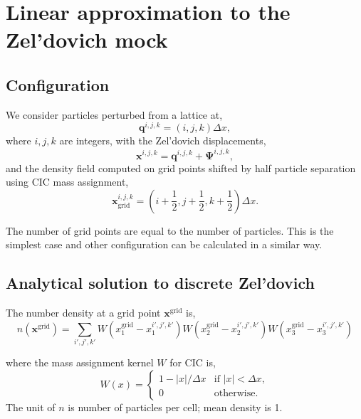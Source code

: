 \documentclass[a4paper,11pt]{article}
\begin{document}
\section{Linear approximation to the Zel'dovich mock}

\subsection{Configuration}

We consider particles perturbed from a lattice at,
\begin{equation}
  \bm{q}^{i,j,k} = (i, j, k) \Delta x,
\end{equation}
where $i, j, k$ are integers, with the Zel'dovich displacements,
\begin{equation}
  \bm{x}^{i,j,k} = \bm{q}^{i,j,k} + \bm{\Psi}^{i,j,k},
\end{equation}
and the density field computed on grid points
shifted by half particle separation using CIC mass assignment,
\begin{equation}
  \bm{x}_\mathrm{grid}^{i,j,k} =
    \left(i + \frac{1}{2}, j + \frac{1}{2}, k+\frac{1}{2} \right) \Delta x.
\end{equation}

The number of grid points are equal to the number of particles. This
is the simplest case and other configuration can be calculated in a
similar way.


\subsection{Analytical solution to discrete Zel'dovich}

The number density at a grid point $\bm{x}^\mathrm{grid}$ is,
\begin{equation}
  n(\bm{x}^\mathrm{grid}) =
  \sum_{i', j', k'} W(x^\mathrm{grid}_1 - x_1^{i', j', k'})
                  W(x^\mathrm{grid}_2 - x_2^{i', j', k'})
                  W(x^\mathrm{grid}_3 - x_3^{i', j', k'})
\end{equation}

where the mass assignment kernel $W$ for CIC is,
\begin{equation}
  W(x) = 
  \begin{cases}
  
    1 - |x|/\Delta x &\text{if } |x| < \Delta x,\\
    0                & \text{otherwise}.
  \end{cases}
\end{equation}
The unit of $n$ is number of particles per cell;
mean density is 1.
\end{document}
